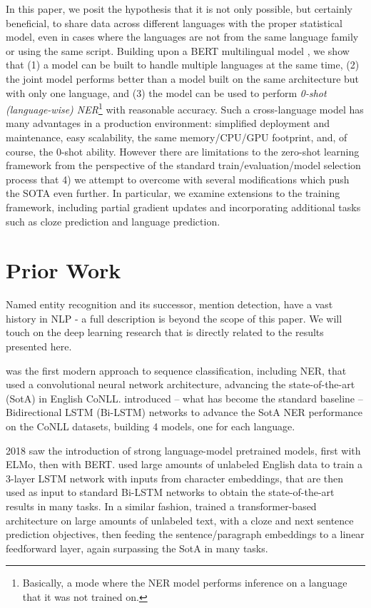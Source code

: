 \documentclass[letterpaper]{article} \usepackage{aaai20}  \usepackage{times}  \usepackage{helvet} \usepackage{courier}  \usepackage[hyphens]{url}  \usepackage{graphicx} \urlstyle{rm} \def\UrlFont{\rm}  \usepackage{graphicx}  \frenchspacing  \setlength{\pdfpagewidth}{8.5in}  \setlength{\pdfpageheight}{11in}  \usepackage{amsmath}
\newcommand{\citet}[1]{\citeauthor{#1} \shortcite{#1}}
\begin{document}
In this paper, we posit the hypothesis that it is not only possible,
but certainly beneficial, to share data across different languages
with the proper statistical model, even in cases where the languages
are not from the same language family or using the same script. Building upon a BERT multilingual model \cite{BERT18}, we show that (1) a model can be
built to handle multiple languages at the same time, (2) the joint
model performs better than a model built on the same architecture but
with only one language, and (3) the model can be used to perform
\emph{0-shot (language-wise) NER}\footnote{Basically, a mode
  where the NER model performs inference on a language that it was not
  trained on.} with reasonable accuracy. Such a cross-language model
has many advantages in a production environment: simplified deployment
and maintenance, easy scalability, the same memory/CPU/GPU footprint,
and, of course, the 0-shot ability.
However there are limitations to the zero-shot learning framework from
the perspective of the standard train/evaluation/model selection process
that 4) we attempt to overcome with several modifications which push the
SOTA even further. In particular, we examine extensions to the training framework, including partial gradient updates and incorporating additional tasks such as cloze prediction and language prediction.



 \section{Prior Work}\label{sec:Prior-Work}
Named entity recognition and its successor, mention detection, have
a vast history in NLP - a full description is beyond the scope of
this paper. We will touch on the deep learning research that is directly related to the results presented here.

\citet{collobert08} was the first modern approach to sequence
classification, including NER, that used a convolutional neural network architecture, advancing the state-of-the-art (SotA) in English
CoNLL.  \citet{LampleBSKD16} introduced -- what has become the
standard baseline -- Bidirectional LSTM (Bi-LSTM) networks to advance the SotA
NER performance on the CoNLL datasets, building 4 models, one for each
language.

2018 saw the introduction of strong language-model pretrained models,
first with ELMo\cite{ELMo18}, then with BERT\cite{BERT18}. \citeauthor{ELMo18} used large amounts of unlabeled English data to train a 3-layer LSTM
network with inputs from character embeddings, that are then used as
input to standard Bi-LSTM networks to obtain the state-of-the-art
results in many tasks. In a similar fashion, \citet{BERT18} trained a
transformer-based architecture on large amounts of unlabeled text,
with a cloze and next sentence prediction objectives, then feeding the
sentence/paragraph embeddings to a linear feedforward layer, again
surpassing the SotA in many tasks.
\end{document}
